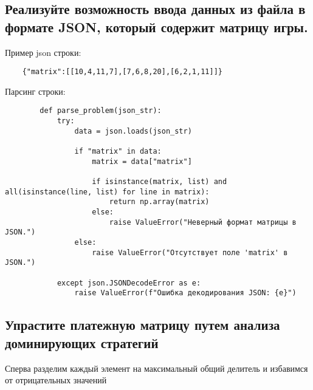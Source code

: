 \documentclass{article}
\begin{document}
\subsection{Реализуйте возможность ввода данных из файла в формате JSON, который содержит матрицу игры.}

Пример json строки:
\begin{listing}[H]
    \begin{verbatim}
    {"matrix":[[10,4,11,7],[7,6,8,20],[6,2,1,11]]}
    \end{verbatim}
\end{listing}

Парсинг строки:

\begin{listing}[H]
    \begin{verbatim}
        def parse_problem(json_str):
            try:
                data = json.loads(json_str)

                if "matrix" in data:
                    matrix = data["matrix"]

                    if isinstance(matrix, list) and all(isinstance(line, list) for line in matrix):
                        return np.array(matrix)
                    else:
                        raise ValueError("Неверный формат матрицы в JSON.")
                else:
                    raise ValueError("Отсутствует поле 'matrix' в JSON.")

            except json.JSONDecodeError as e:
                raise ValueError(f"Ошибка декодирования JSON: {e}")
        \end{verbatim}
\end{listing}

\subsection{Упрастите платежную матрицу путем анализа доминирующих стратегий}

Сперва разделим каждый элемент на максимальный общий делитель и избавимся от отрицательных значений
\end{document}
